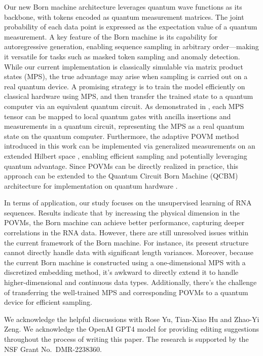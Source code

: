 \documentclass[aps,prb,twocolumn,superscriptaddress]{revtex4-2}
\begin{document}
Our new Born machine architecture leverages quantum wave functions as its backbone, with tokens encoded as quantum measurement matrices. The joint probability of each data point is expressed as the expectation value of a quantum measurement. A key feature of the Born machine is its capability for autoregressive generation, enabling sequence sampling in arbitrary order—making it versatile for tasks such as masked token sampling and anomaly detection. While our current implementation is classically simulable via matrix product states (MPS), the true advantage may arise when sampling is carried out on a real quantum device. A promising strategy is to train the model efficiently on classical hardware using MPS, and then transfer the trained state to a quantum computer via an equivalent quantum circuit. As demonstrated in \cite{2022PhRvX..12a1047H, 2024QS&T....9a5012R}, each MPS tensor can be mapped to local quantum gates with ancilla insertions and measurements in a quantum circuit, representing the MPS as a real quantum state on the quantum computer. Furthermore, the adaptive POVM method introduced in this work can be implemented via generalized measurements on an extended Hilbert space \cite{preskill1998lecture}, enabling efficient sampling and potentially leveraging quantum advantage. Since POVMs can be directly realized in practice, this approach can be extended to the Quantum Circuit Born Machine (QCBM) architecture for implementation on quantum hardware \cite{PhysRevA.98.062324, 2019npjQI...5...45B}.

In terms of application, our study focuses on the unsupervised learning of RNA sequences. Results indicate that by increasing the physical dimension in the POVMs, the Born machine can achieve better performance, capturing deeper correlations in the RNA data. However, there are still unresolved issues within the current framework of the Born machine. For instance, its present structure cannot directly handle data with significant length variances. Moreover, because the current Born machine is constructed using a one-dimensional MPS with a discretized embedding method, it's awkward to directly extend it to handle higher-dimensional and continuous data types. Additionally, there's the challenge of transferring the well-trained MPS and corresponding POVMs to a quantum device for efficient sampling.

\begin{acknowledgments}
We acknowledge the helpful discussions with Rose Yu, Tian-Xiao Hu and Zhao-Yi Zeng. 
We acknowledge the OpenAI GPT4 model for providing editing suggestions throughout the process of writing this paper. The research is supported by the NSF Grant No.~DMR-2238360.
\end{acknowledgments}
















\onecolumngrid
\newpage
\appendix
\setcounter{secnumdepth}{2}
\end{document}
